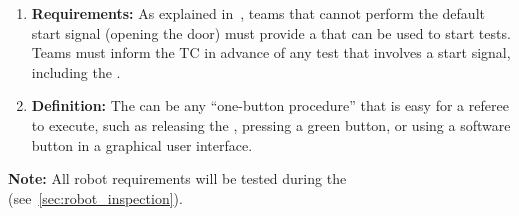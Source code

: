 \begin{enumerate}
	\item \textbf{Requirements:} As explained in~, teams that cannot perform the default start signal (opening the door) must provide a \StartButton{} that can be used to start tests.
	Teams must inform the TC in advance of any test that involves a start signal, including the \RobotInspection{}.
	\item \textbf{Definition:} The \StartButton{} can be any \enquote{one-button procedure} that is easy for a referee to execute, such as releasing the \EmergencyStop{}, pressing a green button, or using a software button in a graphical user interface.
\end{enumerate}

\noindent\textbf{Note:} All robot requirements will be tested during the \RobotInspection{} (see~\ref{sec:robot_inspection}).




